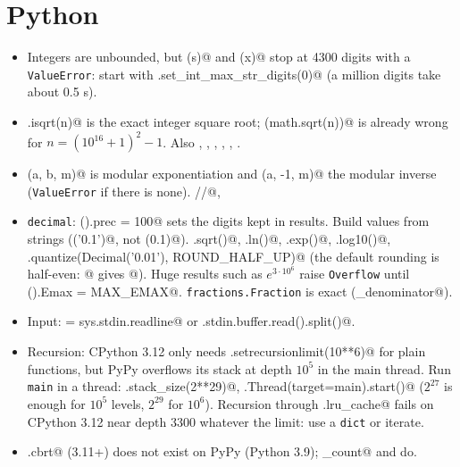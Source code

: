 \section{Python}
	\begin{itemize}
		\item Integers are unbounded, but \verb@int(s)@ and \verb@str(x)@ stop at 4300 digits with a \texttt{ValueError}: start with \verb@sys.set_int_max_str_digits(0)@ (a million digits take about 0.5 s).
		\item \verb@math.isqrt(n)@ is the exact integer square root; \verb@int(math.sqrt(n))@ is already wrong for $n = (10^{16}+1)^2 - 1$. Also \verb@gcd@, \verb@lcm@, \verb@comb@, \verb@perm@, \verb@factorial@, \verb@prod@.
		\item \verb@pow(a, b, m)@ is modular exponentiation and \verb@pow(a, -1, m)@ the modular inverse (\texttt{ValueError} if there is none). \verb@//@, \verb@%@ and \verb@divmod@ round towards $-\infty$ (unlike C++). Also \verb@x.bit_length()@, \verb@x.bit_count()@, \verb@int(s, base)@, \verb@format(x, 'b')@.
		\item \texttt{decimal}: \verb@getcontext().prec = 100@ sets the digits kept in results. Build values from strings (\verb@Decimal('0.1')@, not \verb@Decimal(0.1)@). \verb@.sqrt()@, \verb@.ln()@, \verb@.exp()@, \verb@.log10()@, \verb@.quantize(Decimal('0.01'), ROUND_HALF_UP)@ (the default rounding is half-even: @ gives @).
			Huge results such as $e^{3 \cdot 10^6}$ raise \texttt{Overflow} until \verb@getcontext().Emax = MAX_EMAX@. \texttt{fractions.Fraction} is exact (\verb@limit_denominator@).
		\item Input: \verb@input = sys.stdin.readline@ or \verb@sys.stdin.buffer.read().split()@.
		\item Recursion: CPython 3.12 only needs \verb@sys.setrecursionlimit(10**6)@ for plain functions, but PyPy overflows its stack at depth $10^5$ in the main thread. Run \texttt{main} in a thread:
			\verb@threading.stack_size(2**29)@, \verb@threading.Thread(target=main).start()@ ($2^{27}$ is enough for $10^5$ levels, $2^{29}$ for $10^6$).
			Recursion through \verb@functools.lru_cache@ fails on CPython 3.12 near depth 3300 whatever the limit: use a \texttt{dict} or iterate.
		\item \verb@math.cbrt@ (3.11+) does not exist on PyPy (Python 3.9); \verb@bit_count@ and \verb@lcm@ do.
	\end{itemize}
